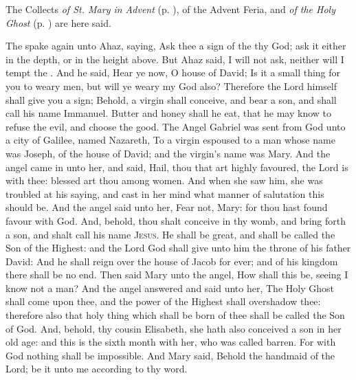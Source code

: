 \begin{rubric}
    The Collects \emph{of St. Mary in Advent} (p. \pageref{SPMaryInAdvent}), of the Advent Feria, and \emph{of the Holy Ghost} (p. \pageref{SPHolyGhost}) are here said.
\end{rubric}
 The  spake again unto Ahaz, saying, Ask thee a sign of the  thy God; ask it either in the depth, or in the height above. But Ahaz said, I will not ask, neither will I tempt the . And he said, Hear ye now, O house of David; Is it a small thing for you to weary men, but will ye weary my God also? Therefore the Lord himself shall give you a sign; Behold, a virgin shall conceive, and bear a son, and shall call his name Immanuel. Butter and honey shall he eat, that he may know to refuse the evil, and choose the good.
 The Angel Gabriel was sent from God unto a city of Galilee, named Nazareth, To a virgin espoused to a man whose name was Joseph, of the house of David; and the virgin's name was Mary. And the angel came in unto her, and said, Hail, thou that art highly favoured, the Lord is with thee: blessed art thou among women. And when she saw him, she was troubled at his saying, and cast in her mind what manner of salutation this should be. And the angel said unto her, Fear not, Mary: for thou hast found favour with God. And, behold, thou shalt conceive in thy womb, and bring forth a son, and shalt call his name {\textsc{Jesus}}. He shall be great, and shall be called the Son of the Highest: and the Lord God shall give unto him the throne of his father David: And he shall reign over the house of Jacob for ever; and of his kingdom there shall be no end. Then said Mary unto the angel, How shall this be, seeing I know not a man? And the angel answered and said unto her, The Holy Ghost shall come upon thee, and the power of the Highest shall overshadow thee: therefore also that holy thing which shall be born of thee shall be called the Son of God. And, behold, thy cousin Elisabeth, she hath also conceived a son in her old age: and this is the sixth month with her, who was called barren. For with God nothing shall be impossible. And Mary said, Behold the handmaid of the Lord; be it unto me according to thy word.
